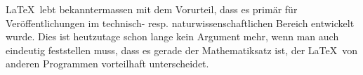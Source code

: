 
\LaTeX\ lebt bekanntermassen mit dem Vorurteil, dass es primär für Veröffentlichungen im technisch- resp. naturwissenschaftlichen Bereich entwickelt wurde. Dies ist heutzutage schon lange kein Argument mehr, wenn man auch eindeutig feststellen muss, dass es gerade der Mathematiksatz ist, der \LaTeX\ von anderen Programmen vorteilhaft unterscheidet.
